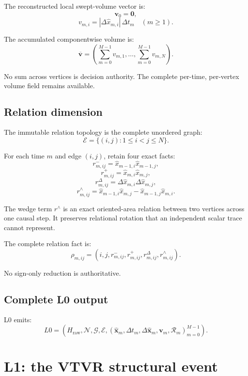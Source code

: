 \documentclass[11pt]{article}
\newcommand{\Xhat}{\widehat{\mathbf{x}}}
\newcommand{\DeltaX}{\Delta\widehat{\mathbf{x}}}
\newcommand{\Relation}{\mathcal{R}}
\begin{document}
The reconstructed local swept-volume vector is:
\[
  \mathbf{v}_0=\mathbf{0},
\]
\[
  v_{m,i}
  =
  |\Delta\widehat{x}_{m,i}|\,\Delta t_m
  \quad(m\geq1).
\]

The accumulated componentwise volume is:
\[
  \overline{\mathbf{v}}
  =
  \left(
    \sum_{m=0}^{M-1}v_{m,1},
    \ldots,
    \sum_{m=0}^{M-1}v_{m,N}
  \right).
\]

No sum across vertices is decision authority. The complete per-time,
per-vertex volume field remains available.

\subsection{Relation dimension}

The immutable relation topology is the complete unordered graph:
\[
  \mathcal{E}
  =
  \{(i,j):1\leq i<j\leq N\}.
\]

For each time \(m\) and edge \((i,j)\), retain four exact facts:
\[
  r^{-}_{m,ij}
  =
  \widehat{x}_{m-1,i}\widehat{x}_{m-1,j},
\]
\[
  r^{+}_{m,ij}
  =
  \widehat{x}_{m,i}\widehat{x}_{m,j},
\]
\[
  r^{\Delta}_{m,ij}
  =
  \Delta\widehat{x}_{m,i}
  \Delta\widehat{x}_{m,j},
\]
\[
  r^{\wedge}_{m,ij}
  =
  \widehat{x}_{m-1,i}\widehat{x}_{m,j}
  -
  \widehat{x}_{m-1,j}\widehat{x}_{m,i}.
\]

The wedge term \(r^{\wedge}\) is an exact oriented-area relation between two
vertices across one causal step. It preserves relational rotation that an
independent scalar trace cannot represent.

The complete relation fact is:
\[
  \rho_{m,ij}
  =
  \left(
    i,j,
    r^{-}_{m,ij},
    r^{+}_{m,ij},
    r^{\Delta}_{m,ij},
    r^{\wedge}_{m,ij}
  \right).
\]

No sign-only reduction is authoritative.

\subsection{Complete L0 output}

L0 emits:
\[
  L0
  =
  \left(
    H_{\mathrm{raw}},
    \mathcal{N},
    \mathcal{G},
    \mathcal{E},
    (\Xhat_m,\Delta t_m,\DeltaX_m,
     \mathbf{v}_m,\Relation_m)_{m=0}^{M-1}
  \right).
\]

\section{L1: the VTVR structural event}
\end{document}
